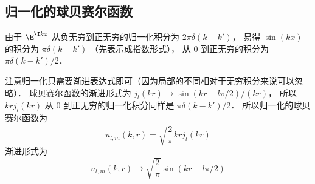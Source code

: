 \subsection{归一化的球贝赛尔函数}
由于 $\E^{\I kx}$ 从负无穷到正无穷的归一化积分为 $2\pi\delta(k-k')$， 易得 $\sin(kx)$ 的积分为 $\pi\delta(k-k')$ （先表示成指数形式）， 从 0 到正无穷的积分为 $\pi\delta(k-k')/2$．

注意归一化只需要渐进表达式即可（因为局部的不同相对于无穷积分来说可以忽略）． 球贝赛尔函数的渐进形式为 $j_l(kr) \to \sin(kr - l\pi/2)/(kr)$， 所以 $kr j_l(kr)$ 从 0 到正无穷的归一化积分同样是 $\pi\delta(k-k')/2$． 所以归一化的球贝赛尔函数为
\begin{equation}
u_{l,m}(k, r) = \sqrt{\frac{2}{\pi}} kr j_l(kr)
\end{equation}
渐进形式为
\begin{equation}
u_{l,m}(k, r) \to  \sqrt{\frac{2}{\pi}} \sin(kr - l\pi/2)
\end{equation}
